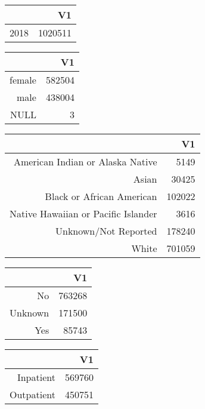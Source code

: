 \bigskip\bigskip
\centering
\begin{tabular}{rr}
  \hline
 & V1 \\ 
  \hline
2018 & 1020511 \\ 
   \hline
\end{tabular}

\bigskip\bigskip
\centering
\begin{tabular}{rr}
  \hline
 & V1 \\ 
  \hline
female & 582504 \\ 
  male & 438004 \\ 
  NULL &   3 \\ 
   \hline
\end{tabular}

\bigskip\bigskip
\centering
\begin{tabular}{rr}
  \hline
 & V1 \\ 
  \hline
American Indian or Alaska Native & 5149 \\ 
  Asian & 30425 \\ 
  Black or African American & 102022 \\ 
  Native Hawaiian or Pacific Islander & 3616 \\ 
  Unknown/Not Reported & 178240 \\ 
  White & 701059 \\ 
   \hline
\end{tabular}

\bigskip\bigskip
\centering
\begin{tabular}{rr}
  \hline
 & V1 \\ 
  \hline
No & 763268 \\ 
  Unknown & 171500 \\ 
  Yes & 85743 \\ 
   \hline
\end{tabular}

\bigskip\bigskip
\centering
\begin{tabular}{rr}
  \hline
 & V1 \\ 
  \hline
Inpatient & 569760 \\ 
  Outpatient & 450751 \\ 
   \hline
\end{tabular}

